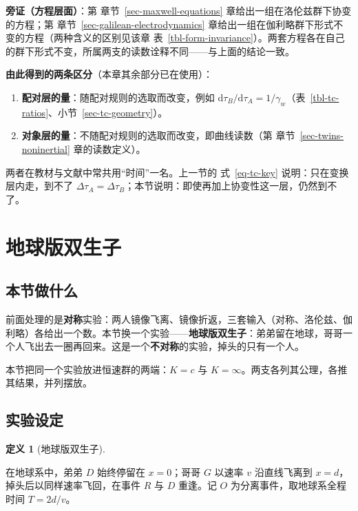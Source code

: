 \documentclass[
  chinese,
  a4paper,
  UTF8,
  12pt,
  oneside,
  openany]{ctexbook}
\providecommand{\tightlist}{%
  \setlength{\itemsep}{0pt}\setlength{\parskip}{0pt}}
\theoremstyle{plain}
\theoremstyle{plain}
\theoremstyle{plain}
\theoremstyle{definition}
\newtheorem{definition}{定义}[chapter]
\theoremstyle{plain}
\theoremstyle{plain}
\theoremstyle{remark}
\begin{document}
\textbf{旁证（方程层面）}：第 章节~\ref{sec-maxwell-equations}
章给出一组在洛伦兹群下协变的方程；第
章节~\ref{sec-galilean-electrodynamics}
章给出一组在伽利略群下形式不变的方程（两种含义的区别见该章
表~\ref{tbl-form-invariance}）。两套方程各在自己的群下形式不变，所属两支的读数诠释不同------与上面的结论一致。

\textbf{由此得到的两条区分}（本章其余部分已在使用）：

\begin{enumerate}
\def\labelenumi{\arabic{enumi}.}
\tightlist
\item
  \textbf{配对层的量}：随配对规则的选取而改变，例如
  \(\mathrm{d}\tau_B/\mathrm{d}\tau_A=1/\gamma_w\)（表~\ref{tbl-tc-ratios}、小节~\ref{sec-tc-geometry}）。
\item
  \textbf{对象层的量}：不随配对规则的选取而改变，即曲线读数（第
  章节~\ref{sec-twins-noninertial} 章的读数定义）。
\end{enumerate}

两者在教材与文献中常共用``时间''一名。上一节的 式~\ref{eq-tc-key}
说明：只在变换层内走，到不了
\(\Delta\tau_A=\Delta\tau_B\)；本节说明：即使再加上协变性这一层，仍然到不了。

\section{地球版双生子}\label{sec-twins-absolute}

\subsection{本节做什么}\label{sec-ta-scope}

前面处理的是\textbf{对称}实验：两人镜像飞离、镜像折返，三套输入（对称、洛伦兹、伽利略）各给出一个数。本节换一个实验------\textbf{地球版双生子}：弟弟留在地球，哥哥一个人飞出去一圈再回来。这是一个\textbf{不对称}的实验，掉头的只有一个人。

本节把同一个实验放进恒速群的两端：\(K=c\) 与
\(K=\infty\)。两支各列其公理，各推其结果，并列摆放。

\subsection{实验设定}\label{sec-ta-setup}

\begin{definition}[地球版双生子]\protect\hypertarget{def-ta-setup}{}\label{def-ta-setup}

在地球系中，弟弟 \(D\) 始终停留在 \(x=0\)；哥哥 \(G\) 以速率 \(v\)
沿直线飞离到 \(x=d\)，掉头后以同样速率飞回，在事件 \(R\) 与 \(D\)
重逢。记 \(O\) 为分离事件，取地球系全程时间 \(T=2d/v\)。

\end{definition}
\end{document}
